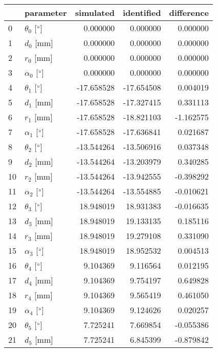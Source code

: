 \documentclass{standalone}%
\begin{document}
%
\normalsize%
\begin{tabular}{llrrr}
\toprule
{} &                 parameter &  simulated & identified & difference \\
\midrule
0  &  $\theta_{0}$ [$\degree$] &   0.000000 &   0.000000 &   0.000000 \\
1  &              $d_{0}$ [mm] &   0.000000 &   0.000000 &   0.000000 \\
2  &              $r_{0}$ [mm] &   0.000000 &   0.000000 &   0.000000 \\
3  &  $\alpha_{0}$ [$\degree$] &   0.000000 &   0.000000 &   0.000000 \\
4  &  $\theta_{1}$ [$\degree$] & -17.658528 & -17.654508 &   0.004019 \\
5  &              $d_{1}$ [mm] & -17.658528 & -17.327415 &   0.331113 \\
6  &              $r_{1}$ [mm] & -17.658528 & -18.821103 &  -1.162575 \\
7  &  $\alpha_{1}$ [$\degree$] & -17.658528 & -17.636841 &   0.021687 \\
8  &  $\theta_{2}$ [$\degree$] & -13.544264 & -13.506916 &   0.037348 \\
9  &              $d_{2}$ [mm] & -13.544264 & -13.203979 &   0.340285 \\
10 &              $r_{2}$ [mm] & -13.544264 & -13.942555 &  -0.398292 \\
11 &  $\alpha_{2}$ [$\degree$] & -13.544264 & -13.554885 &  -0.010621 \\
12 &  $\theta_{3}$ [$\degree$] &  18.948019 &  18.931383 &  -0.016635 \\
13 &              $d_{3}$ [mm] &  18.948019 &  19.133135 &   0.185116 \\
14 &              $r_{3}$ [mm] &  18.948019 &  19.279108 &   0.331090 \\
15 &  $\alpha_{3}$ [$\degree$] &  18.948019 &  18.952532 &   0.004513 \\
16 &  $\theta_{4}$ [$\degree$] &   9.104369 &   9.116564 &   0.012195 \\
17 &              $d_{4}$ [mm] &   9.104369 &   9.754197 &   0.649828 \\
18 &              $r_{4}$ [mm] &   9.104369 &   9.565419 &   0.461050 \\
19 &  $\alpha_{4}$ [$\degree$] &   9.104369 &   9.124626 &   0.020257 \\
20 &  $\theta_{5}$ [$\degree$] &   7.725241 &   7.669854 &  -0.055386 \\
21 &              $d_{5}$ [mm] &   7.725241 &   6.845399 &  -0.879842 \\

\end{tabular}
\end{document}
